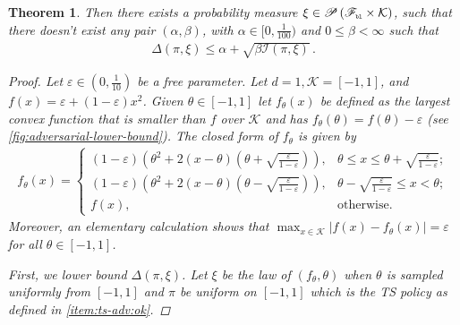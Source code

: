 \documentclass[letter, 12pt]{report}
\newcommand{\pb}{\text{\tiny\texttt{b}}}
\newcommand{\pl}{\text{\tiny\texttt{l}}}
\newcommand{\cK}{\mathcal K}
\newcommand{\sF}{\mathscr F}
\newcommand{\sP}{\mathscr P}
\newcommand{\I}{\mathcal{I}}
\newcommand{\1}{\mathbf{1}}
\newcommand{\ts}{\textsc{TS}\xspace}
\renewcommand{\epsilon}{\varepsilon}
\theoremstyle{plain}
\newtheorem{theorem}{Theorem}
\theoremstyle{definition}
\theoremstyle{remark}
\begin{document}
\begin{theorem}
    Then there exists a probability measure $\xi \in \sP\left(\sF_{\pb\pl} \times \cK\right)$,
    such that there doesn't exist any pair $(\alpha, \beta)$, with $\alpha \in [0, \tfrac{1}{100})$ and
    $0 \leq \beta < \infty$ such that
    \begin{align*}
        \Delta(\pi, \xi) \leq \alpha + \sqrt{\beta \I(\pi, \xi)}\,.
    \end{align*}
    \begin{proof}
        Let $\epsilon \in (0, \frac{1}{10})$ be a free parameter.
        Let $d = 1, \cK = [-1,1]$, and $f(x) = \epsilon + (1 - \epsilon) x^2$.
        Given $\theta \in [-1,1]$ let $f_\theta(x)$ be defined as the largest convex function
        that is smaller than $f$ over $\cK$ and has $f_\theta(\theta) = f(\theta) - \epsilon$
        (see \cref{fig:adversarial-lower-bound}).
        The closed form of $f_\theta$ is given by
        \begin{align*}
            f_\theta(x) = \begin{cases}
                              (1-\epsilon) (\theta^2 + 2 (x - \theta)(\theta + \sqrt{\frac{\epsilon}{1-\epsilon}})),
                                    & \theta \leq x \leq \theta + \sqrt{\frac{\epsilon}{1-\epsilon}}; \\
                              (1-\epsilon) (\theta^2 + 2 (x - \theta)(\theta - \sqrt{\frac{\epsilon}{1-\epsilon}})),
                                    & \theta - \sqrt{\frac{\epsilon}{1-\epsilon}} \leq x < \theta;    \\
                              f(x), & \text{otherwise}.
                          \end{cases}
        \end{align*}
        Moreover, an elementary calculation shows that $\max_{x \in \cK} |f(x) - f_\theta(x)| = \epsilon$ for all $\theta \in [-1,1]$.

        First, we lower bound $\Delta(\pi, \xi)$.
        Let $\xi$ be the law of $(f_\theta, \theta)$ when $\theta$ is sampled uniformly from $[-1,1]$ and $\pi$ be uniform on $[-1,1]$ which is the \ts{}
        policy as defined in \ref{item:ts-adv:ok}.


\end{proof}
\end{theorem}
\end{document}
